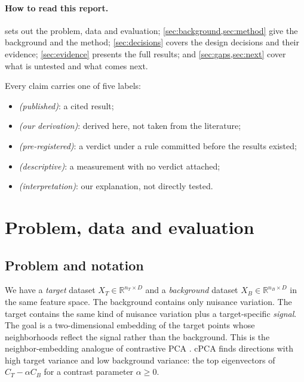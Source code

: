 \documentclass[10pt]{article}
\newcommand{\cpub}{\textit{\small (published)}}
\newcommand{\cder}{\textit{\small (our derivation)}}
\newcommand{\cpre}{\textit{\small (pre-registered)}}
\newcommand{\cdesc}{\textit{\small (descriptive)}}
\newcommand{\cinterp}{\textit{\small (interpretation)}}
\newcommand{\R}{\mathbb{R}}
\begin{document}
\paragraph{How to read this report.}  sets out the problem, data and evaluation; \cref{sec:background,sec:method} give the background and the method; \cref{sec:decisions} covers the design decisions and their evidence; \cref{sec:evidence} presents the full results; and \cref{sec:gaps,sec:next} cover what is untested and what comes next.

Every claim carries one of five labels:
\begin{itemize}
  \item \cpub{}: a cited result;
  \item \cder{}: derived here, not taken from the literature;
  \item \cpre{}: a verdict under a rule committed before the results existed;
  \item \cdesc{}: a measurement with no verdict attached;
  \item \cinterp{}: our explanation, not directly tested.
\end{itemize}

\section{Problem, data and evaluation}
\label{sec:setup}

\subsection{Problem and notation}

We have a \emph{target} dataset $X_T \in \R^{n_T\times D}$ and a \emph{background} dataset $X_B \in \R^{n_B\times D}$ in the same feature space. The background contains only nuisance variation. The target contains the same kind of nuisance variation plus a target-specific \emph{signal}. The goal is a two-dimensional embedding of the target points whose neighborhoods reflect the signal rather than the background. This is the neighbor-embedding analogue of contrastive PCA \cite{abid2018cpca}. cPCA finds directions with high target variance and low background variance: the top eigenvectors of $C_T - \alpha C_B$ for a contrast parameter $\alpha \ge 0$.
\end{document}
